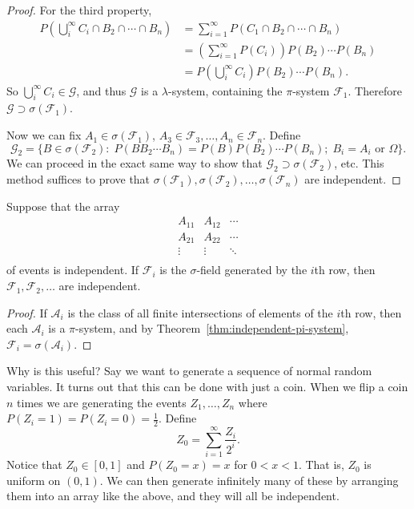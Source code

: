 \documentclass[11pt,fleqn]{book} %
\begin{document}
\begin{proof}
	For the third property,
	\begin{align*}
		P \left( \bigcup_i^\infty C_i \cap B_2 \cap \cdots \cap B_n \right) &= \sum_{i=1}^\infty P(C_1 \cap B_2 \cap \cdots \cap B_n) \tag{$C_i$ disjoint} \\
		&= \left( \sum_{i=1}^\infty P(C_i) \right) P(B_2) \cdots P(B_n) \\
		&= P \left( \bigcup_i^\infty C_i \right) P(B_2) \cdots P(B_n). \tag{$C_i$ disjoint}
	\end{align*}
	So $\bigcup_i^\infty C_i \in \mathcal{G}$, and thus $\mathcal{G}$ is a $\lambda$-system, containing the $\pi$-system $\mathcal{F}_1$. Therefore $\mathcal{G} \supset \sigma(\mathcal{F}_1)$.

	Now we can fix $A_1 \in \sigma(\mathcal{F}_1)$, $A_3 \in \mathcal{F}_3, \dots, A_n \in \mathcal{F}_n$. Define
	\[
		\mathcal{G}_2 = \{B \in \sigma(\mathcal{F}_2):\;P(B B_2 \cdots B_n) = P(B)P(B_2) \cdots P(B_n);\;B_i=A_i \textrm{ or } \Omega\}.
	\]
	We can proceed in the exact same way to show that $\mathcal{G}_2 \supset \sigma(\mathcal{F}_2)$, etc. This method suffices to prove that $\sigma(\mathcal{F}_1), \sigma(\mathcal{F}_2), \dots, \sigma(\mathcal{F}_n)$ are independent.
\end{proof}

\begin{corollary}
	Suppose that the array
	\[
	\begin{array}{ccc}
		A_{11} & A_{12} & \cdots \\
		A_{21} & A_{22} & \cdots \\
		\vdots & \vdots & \ddots \\
	\end{array}
	\]
	of events is independent. If $\mathcal{F}_i$ is the $\sigma$-field generated by the $i$th row, then $\mathcal{F}_1,\mathcal{F}_2,\dots$ are independent.
\end{corollary}

\begin{proof}
	If $\mathcal{A}_i$ is the class of all finite intersections of elements of the $i$th row, then each $\mathcal{A}_i$ is a $\pi$-system, and by Theorem~\ref{thm:independent-pi-system}, $\mathcal{F}_i = \sigma(\mathcal{A}_i)$.
\end{proof}

Why is this useful? Say we want to generate a sequence of normal random variables. It turns out that this can be done with just a coin. When we flip a coin $n$ times we are generating the events $Z_1,\dots,Z_n$ where $P(Z_i=1) = P(Z_i=0) = \frac{1}{2}$. Define
\[
	Z_0 = \sum_{i=1}^\infty \frac{Z_i}{2^i}.
\]
Notice that $Z_0 \in [0,1]$ and $P(Z_0 = x) = x$ for $0 < x < 1$. That is, $Z_0$ is uniform on $(0,1)$. We can then generate infinitely many of these by arranging them into an array like the above, and they will all be independent.
\end{document}
